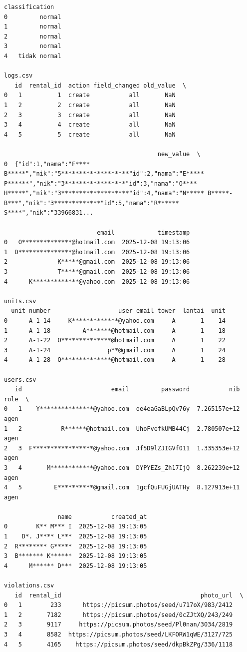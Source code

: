 \begin{lstlisting}[caption={Output 8}]
  classification  
0         normal  
1         normal  
2         normal  
3         normal  
4   tidak normal  

logs.csv
   id  rental_id  action field_changed old_value  \
0   1          1  create           all       NaN   
1   2          2  create           all       NaN   
2   3          3  create           all       NaN   
3   4          4  create           all       NaN   
4   5          5  create           all       NaN   

                                           new_value  \
0  {"id":1,"nama":"F**** B*****","nik":"5*******************"id":2,"nama":"E***** P******","nik":"3*****************"id":3,"nama":"O**** H*****","nik":"3*******************"id":4,"nama":"N***** B*****-B***","nik":"3*************"id":5,"nama":"R****** S****","nik":"33966831...   

                          email            timestamp  
0   O**************@hotmail.com  2025-12-08 19:13:06  
1  D***************@hotmail.com  2025-12-08 19:13:06  
2              K*****@gmail.com  2025-12-08 19:13:06  
3              T*****@gmail.com  2025-12-08 19:13:06  
4      K*************@yahoo.com  2025-12-08 19:13:06  

units.csv
  unit_number                   user_email tower  lantai  unit
0      A-1-14     K*************@yahoo.com     A       1    14
1      A-1-18         A*******@hotmail.com     A       1    18
2      A-1-22  O**************@hotmail.com     A       1    22
3      A-1-24                p**@gmail.com     A       1    24
4      A-1-28  O**************@hotmail.com     A       1    28

users.csv
   id                         email         password           nib  role  \
0   1    Y***************@yahoo.com  oe4eaGaBLpQv76y  7.265157e+12  agen   
1   2           R******@hotmail.com  UhoFvefkUMB44Cj  2.780507e+12  agen   
2   3  F*****************@yahoo.com  Jf5D9lZJIGVf011  1.335353e+12  agen   
3   4       M************@yahoo.com  DYPYEZs_Zh17IjQ  8.262239e+12  agen   
4   5         E**********@gmail.com  1gcfQuFUGjUATHy  8.127913e+11  agen   

               name           created_at  
0        K** M*** I  2025-12-08 19:13:05  
1    D*. J**** L***  2025-12-08 19:13:05  
2  R******** G*****  2025-12-08 19:13:05  
3  B******* K******  2025-12-08 19:13:05  
4      M****** D***  2025-12-08 19:13:05  

violations.csv
   id  rental_id                                       photo_url  \
0   1        233      https://picsum.photos/seed/u717oX/983/2412   
1   2       7182      https://picsum.photos/seed/0cZJtXQ/243/249   
2   3       9117     https://picsum.photos/seed/Pl0nan/3034/2819   
3   4       8582  https://picsum.photos/seed/LKFORW1qWE/3127/725   
4   5       4165    https://picsum.photos/seed/dkpBkZPg/336/1118   


\end{lstlisting}
